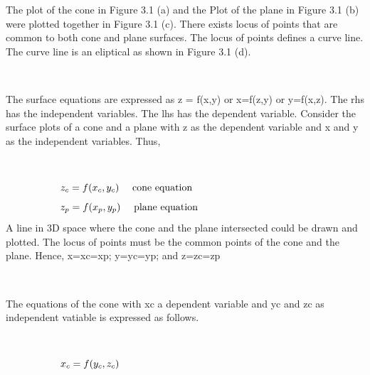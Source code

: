 \documentclass[10pt,a4paper,leqno]{article}
\begin{document}
\begin{CJK*}{UTF8}{gbsn}
\noindent The plot of the cone in Figure 3.1 (a) and the Plot of the plane in Figure 3.1 (b) were plotted together in Figure 3.1 (c). There exists locus of points that are common to both cone and plane surfaces. The locus of points defines a curve line. The curve line is an eliptical as shown in Figure 3.1 (d).
 \par \ \par\noindent The surface equations are expressed as z = f(x,y) or x=f(z,y) or y=f(x,z). The rhs has the independent variables. The lhs has the dependent variable. Consider the surface plots of a cone and a plane with z as the dependent variable and x and y as the independent variables. Thus,
 \par \ \par\begin{equation}
 \begin{minipage}{250pt}
                \begin{flushleft} $\displaystyle z_{c} = f{\left(x_{c},y_{c} \right)}$  \quad cone equation\end{flushleft}
 \end{minipage}
 \end{equation}
\begin{equation}
 \begin{minipage}{250pt}
                \begin{flushleft} $\displaystyle z_{p} = f{\left(x_{p},y_{p} \right)}$  \quad plane equation\end{flushleft}
 \end{minipage}
 \end{equation}
\noindent A line in 3D space where the cone and the plane intersected could be drawn and plotted. The locus of points must be the common points of the cone and the plane. Hence, x=xc=xp; y=yc=yp; and z=zc=zp
 \par \ \par\noindent The equations of the cone with xc a dependent variable and yc and zc as independent vatiable is expressed as follows.
 \par \ \par\begin{equation}
 \begin{minipage}{250pt}
                \begin{flushleft} $\displaystyle x_{c} = f{\left(y_{c},z_{c} \right)}$  \end{flushleft}
 \end{minipage}
 \end{equation}

\end{CJK*}
\end{document}
